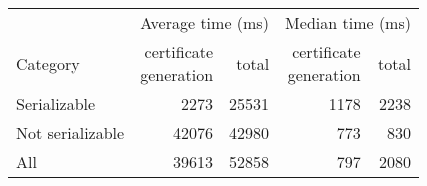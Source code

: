 \begin{table}[H]
	\centering
	\begin{tabular}{l r r r r}
		\toprule
		& \multicolumn{2}{c}{Average time (ms)} 
		& \multicolumn{2}{c}{Median time (ms)} \\
		\cmidrule(lr){2-3} \cmidrule(lr){4-5}
		Category
		& \shortstack{certificate\\generation}
		& total
		& \shortstack{certificate\\generation}
		& total \\
		\midrule
		Serializable      &   2273 &  25531 &  1178 &  2238 \\
		Not serializable  &  42076 &  42980 &   773 &   830 \\
		All               &  39613 &  52858 &   797 &  2080 \\
		\bottomrule
	\end{tabular}
\end{table}
